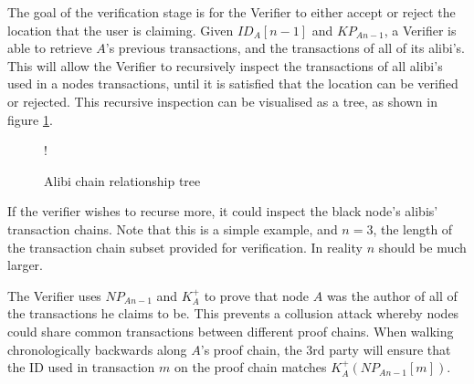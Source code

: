 \null
The goal of the verification stage is for the Verifier to either accept or reject the location that the user is claiming. Given $ID_{A}[n-1]$ and $KP_{An-1}$, a Verifier is able to retrieve $A$'s previous transactions, and the transactions of all of its alibi's. This will allow the Verifier to recursively inspect the transactions of all alibi's used in a nodes transactions, until it is satisfied that the location can be verified or rejected. This recursive inspection can be visualised as a tree, as shown in figure \ref{fig:tree}.

\begin{figure}[H]
\begin{center}
 {!} {}
\vspace{-3cm}
\caption{Alibi chain relationship tree}
\label{fig:tree}
\end{center}
\end{figure}

If the verifier wishes to recurse more, it could inspect the black node's alibis' transaction chains. Note that this is a simple example, and $n = 3$, the length of the transaction chain subset provided for verification. In reality $n$ should be much larger.

The Verifier uses $NP_{An-1}$ and $K^{+}_A$ to prove that node $A$ was the author of all of the transactions he claims to be. This prevents a collusion attack whereby nodes could share common transactions between different proof chains. When walking chronologically backwards along $A$'s proof chain, the 3rd party will ensure that the ID used in transaction $m$ on the proof chain matches $K^{+}_A(NP_{An-1}[m])$.

